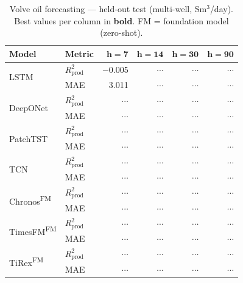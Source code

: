 \documentclass[11pt]{article}
\newcommand{\fm}{\textsuperscript{FM}}
\newcommand{\rp}{R^2_\text{prod}}
\begin{document}
\begin{table}[ht]
\centering
\caption{Volve oil forecasting --- held-out test (multi-well, Sm$^3$/day).
Best values per column in \textbf{bold}.
FM = foundation model (zero-shot).}
\label{tab:volve_main}
\small
\setlength{\tabcolsep}{2.5pt}
\begin{tabular}{@{}ll rrrr @{}}
\toprule
\textbf{Model} & \textbf{Metric} & $\boldsymbol{h{=}7}$ & $\boldsymbol{h{=}14}$ & $\boldsymbol{h{=}30}$ & $\boldsymbol{h{=}90}$ \\
\midrule
\multirow{2}{*}{LSTM}
 & $\rp$ & $-$0.005 & $\cdots$ & $\cdots$ & $\cdots$ \\
 & MAE   & 3.011 & $\cdots$ & $\cdots$ & $\cdots$ \\
\midrule
\multirow{2}{*}{DeepONet}
 & $\rp$ & $\cdots$ & $\cdots$ & $\cdots$ & $\cdots$ \\
 & MAE   & $\cdots$ & $\cdots$ & $\cdots$ & $\cdots$ \\
\midrule
\multirow{2}{*}{PatchTST}
 & $\rp$ & $\cdots$ & $\cdots$ & $\cdots$ & $\cdots$ \\
 & MAE   & $\cdots$ & $\cdots$ & $\cdots$ & $\cdots$ \\
\midrule
\multirow{2}{*}{TCN}
 & $\rp$ & $\cdots$ & $\cdots$ & $\cdots$ & $\cdots$ \\
 & MAE   & $\cdots$ & $\cdots$ & $\cdots$ & $\cdots$ \\
\midrule
\multirow{2}{*}{Chronos\fm}
 & $\rp$ & $\cdots$ & $\cdots$ & $\cdots$ & $\cdots$ \\
 & MAE   & $\cdots$ & $\cdots$ & $\cdots$ & $\cdots$ \\
\midrule
\multirow{2}{*}{TimesFM\fm}
 & $\rp$ & $\cdots$ & $\cdots$ & $\cdots$ & $\cdots$ \\
 & MAE   & $\cdots$ & $\cdots$ & $\cdots$ & $\cdots$ \\
\midrule
\multirow{2}{*}{TiRex\fm}
 & $\rp$ & $\cdots$ & $\cdots$ & $\cdots$ & $\cdots$ \\
 & MAE   & $\cdots$ & $\cdots$ & $\cdots$ & $\cdots$ \\
\bottomrule
\end{tabular}
\end{table}
\end{document}
